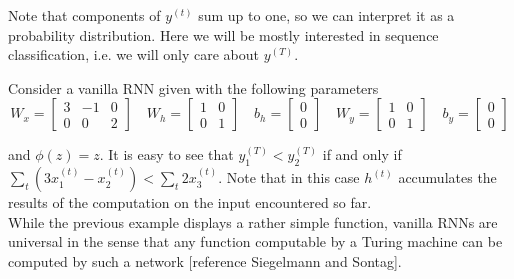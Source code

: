\documentclass[titlepage]{report}
\newenvironment{example*}[1][]
	{
	\par\addvspace{9pt}%
	\noindent%
	\uline{\textbf{Example%
	\ifthenelse{\isempty{#1}}%
		{}%
		{ (#1)}%
	}}%
	\hspace{5pt}%
	\ignorespaces%
	}
	{%
	\par\addvspace{9pt}%
	}
\begin{document}
\noindent
Note that components of $y^{(t)}$ sum up to one, so we can interpret it as a probability distribution. Here we will be mostly interested in sequence classification, i.e. we will only care about $y^{(T)}$.

\begin{example*}
Consider a vanilla RNN given with the following parameters
\begin{equation*}
W_x = \begin{bmatrix} 3 & -1 & 0 \\ 0 & 0 & 2 \end{bmatrix} \quad
W_h = \begin{bmatrix} 1 & 0 \\ 0 & 1 \end{bmatrix} \quad
b_h = \begin{bmatrix} 0 \\ 0 \end{bmatrix} \quad
W_y = \begin{bmatrix} 1 & 0 \\ 0 & 1 \end{bmatrix} \quad
b_y = \begin{bmatrix} 0 \\ 0 \end{bmatrix}
\end{equation*}
\end{example*}

\noindent
and $\phi(z) = z$. It is easy to see that $y_1^{(T)} < y_2^{(T)}$ if and only if $\sum_t ( 3 x_1^{(t)} - x_2^{(t)} ) < \sum_t 2 x_3^{(t)}$. Note that in this case $h^{(t)}$ accumulates the results of the computation on the input encountered so far. \\

While the previous example displays a rather simple function, vanilla RNNs are universal in the sense that any function computable by a Turing machine can be computed by such a network [reference Siegelmann and Sontag].
\end{document}
